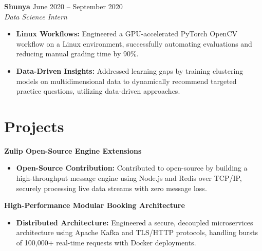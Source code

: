 \documentclass[11pt,a4paper]{article}
\begin{document}
\vspace{3pt}
\noindent
\textbf{Shunya} \hfill June 2020 -- September 2020 \\
\textit{Data Science Intern}
\begin{itemize}[leftmargin=*,noitemsep,topsep=0pt]
    \item \textbf{Linux Workflows:} Engineered a GPU-accelerated PyTorch OpenCV workflow on a Linux environment, successfully automating evaluations and reducing manual grading time by 90\%.
    \item \textbf{Data-Driven Insights:} Addressed learning gaps by training clustering models on multidimensional data to dynamically recommend targeted practice questions, utilizing data-driven approaches.
\end{itemize}

\vspace{-5pt}
\section{Projects}
\noindent
\textbf{Zulip Open-Source Engine Extensions}
\begin{itemize}[leftmargin=*,noitemsep,topsep=0pt]
    \item \textbf{Open-Source Contribution:} Contributed to open-source by building a high-throughput message engine using Node.js and Redis over TCP/IP, securely processing live data streams with zero message loss.
\end{itemize}

\vspace{3pt}
\noindent
\textbf{High-Performance Modular Booking Architecture}
\begin{itemize}[leftmargin=*,noitemsep,topsep=0pt]
    \item \textbf{Distributed Architecture:} Engineered a secure, decoupled microservices architecture using Apache Kafka and TLS/HTTP protocols, handling bursts of 100,000+ real-time requests with Docker deployments.
\end{itemize}
\end{document}
